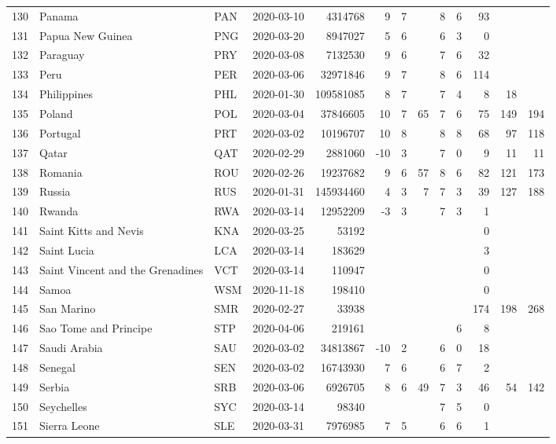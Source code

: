 \begin{longtable}{rlllrrrrrrrrr}
  130 & Panama & PAN & 2020-03-10 & 4314768 & 9 & 7 &  & 8 & 6 & 93 &  &  \\ 
  131 & Papua New Guinea & PNG & 2020-03-20 & 8947027 & 5 & 6 &  & 6 & 3 & 0 &  &  \\ 
  132 & Paraguay & PRY & 2020-03-08 & 7132530 & 9 & 6 &  & 7 & 6 & 32 &  &  \\ 
  133 & Peru & PER & 2020-03-06 & 32971846 & 9 & 7 &  & 8 & 6 & 114 &  &  \\ 
  134 & Philippines & PHL & 2020-01-30 & 109581085 & 8 & 7 &  & 7 & 4 & 8 & 18 &  \\ 
  135 & Poland & POL & 2020-03-04 & 37846605 & 10 & 7 & 65 & 7 & 6 & 75 & 149 & 194 \\ 
  136 & Portugal & PRT & 2020-03-02 & 10196707 & 10 & 8 &  & 8 & 8 & 68 & 97 & 118 \\ 
  137 & Qatar & QAT & 2020-02-29 & 2881060 & -10 & 3 &  & 7 & 0 & 9 & 11 & 11 \\ 
  138 & Romania & ROU & 2020-02-26 & 19237682 & 9 & 6 & 57 & 8 & 6 & 82 & 121 & 173 \\ 
  139 & Russia & RUS & 2020-01-31 & 145934460 & 4 & 3 & 7 & 7 & 3 & 39 & 127 & 188 \\ 
  140 & Rwanda & RWA & 2020-03-14 & 12952209 & -3 & 3 &  & 7 & 3 & 1 &  &  \\ 
  141 & Saint Kitts and Nevis & KNA & 2020-03-25 & 53192 &  &  &  &  &  & 0 &  &  \\ 
  142 & Saint Lucia & LCA & 2020-03-14 & 183629 &  &  &  &  &  & 3 &  &  \\ 
  143 & Saint Vincent and the Grenadines & VCT & 2020-03-14 & 110947 &  &  &  &  &  & 0 &  &  \\ 
  144 & Samoa & WSM & 2020-11-18 & 198410 &  &  &  &  &  & 0 &  &  \\ 
  145 & San Marino & SMR & 2020-02-27 & 33938 &  &  &  &  &  & 174 & 198 & 268 \\ 
  146 & Sao Tome and Principe & STP & 2020-04-06 & 219161 &  &  &  &  & 6 & 8 &  &  \\ 
  147 & Saudi Arabia & SAU & 2020-03-02 & 34813867 & -10 & 2 &  & 6 & 0 & 18 &  &  \\ 
  148 & Senegal & SEN & 2020-03-02 & 16743930 & 7 & 6 &  & 6 & 7 & 2 &  &  \\ 
  149 & Serbia & SRB & 2020-03-06 & 6926705 & 8 & 6 & 49 & 7 & 3 & 46 & 54 & 142 \\ 
  150 & Seychelles & SYC & 2020-03-14 & 98340 &  &  &  & 7 & 5 & 0 &  &  \\ 
  151 & Sierra Leone & SLE & 2020-03-31 & 7976985 & 7 & 5 &  & 6 & 6 & 1 &  &  \\ 

\end{longtable}
